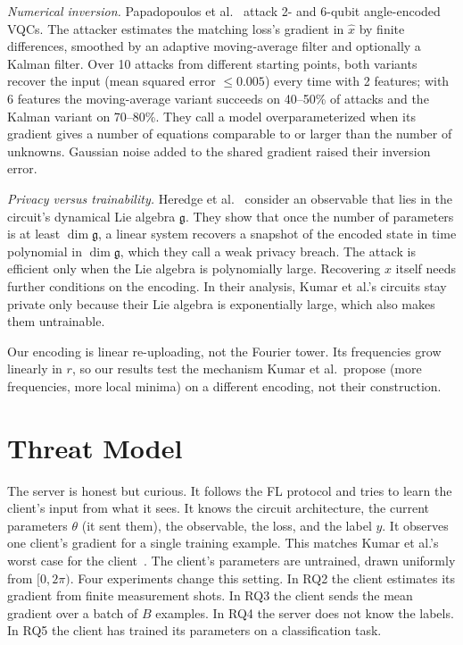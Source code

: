 \documentclass[10pt,conference]{IEEEtran}
\begin{document}
\emph{Numerical inversion.} Papadopoulos et al.~\cite{papadopoulos2025} attack 2- and 6-qubit
angle-encoded VQCs. The attacker estimates the matching loss's gradient in $\hat x$ by finite
differences, smoothed by an adaptive moving-average filter and optionally a Kalman filter. Over 10
attacks from different starting points, both variants recover the input (mean squared error
$\le 0.005$) every time with 2 features; with 6 features the moving-average variant succeeds on
40--50\% of attacks and the Kalman variant on 70--80\%. They call a model overparameterized when
its gradient gives a number of equations comparable to or larger than the number of unknowns.
Gaussian noise added to the shared gradient raised their inversion error.

\emph{Privacy versus trainability.} Heredge et al.~\cite{heredge2025} consider an observable that
lies in the circuit's dynamical Lie algebra $\mathfrak g$. They show that once the number of
parameters is at least $\dim\mathfrak g$, a linear system recovers a snapshot of the encoded state
in time polynomial in $\dim\mathfrak g$, which they call a weak privacy breach. The attack is
efficient only when the Lie algebra is polynomially large. Recovering $x$ itself needs further conditions on the
encoding. In their analysis, Kumar et al.'s circuits stay private only because their Lie algebra
is exponentially large, which also makes them untrainable.

Our encoding is linear re-uploading, not the Fourier tower. Its frequencies grow linearly in $r$,
so our results test the mechanism Kumar et al.\ propose (more frequencies, more local minima) on a
different encoding, not their construction.

\section{Threat Model}
The server is honest but curious. It follows the FL protocol and tries to learn the client's input
from what it sees. It knows the circuit architecture, the current parameters $\theta$ (it sent
them), the observable, the loss, and the label $y$. It observes one client's gradient for a single
training example. This matches Kumar et al.'s worst case for the client~\cite{kumar2023}. The
client's parameters are untrained, drawn uniformly from $[0, 2\pi)$. Four experiments change this
setting. In RQ2 the client estimates its gradient from finite measurement shots. In RQ3 the client sends the mean gradient over a batch of $B$ examples. In RQ4 the server
does not know the labels. In RQ5 the client has trained its parameters on a classification task.
\end{document}
